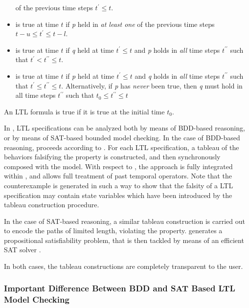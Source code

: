 \begin{itemize}
        of the previous time steps $t^\prime \leq t$.
  \item {} is true at time $t$ if
        \textit{p} held in \emph{at least one} of the previous time
        steps $t-u \leq t^\prime \leq t-l$.
  \item {} is true at time $t$ if \textit{q} held at time
        $t^\prime \leq t$ and \textit{p} holds in \emph{all} time steps $t^{\prime\prime}$ such
        that $t^\prime < t^{\prime\prime} \le t$.
  \item {} is true at time $t$ if \textit{p} held at time
        $t^\prime \leq t$ and \textit{q} holds in \emph{all} time steps $t^{\prime\prime}$ such
        that $t^\prime \le t^{\prime\prime} \le t$. Alternatively, if \textit{p} has \emph{never}
        been true, then \textit{q} must hold in all time steps $t^{\prime\prime}$ such
        that $t_0 \le t^{\prime\prime} \le t$
\end{itemize}
An LTL formula is true if it is true at the initial time $t_0$.

In \nusmv, LTL specifications can be analyzed both by means of
BDD-based reasoning, or by means of SAT-based bounded model
checking.
%
In the case of BDD-based reasoning, \nusmv proceeds according to
\cite{CGH97}.
%
For each LTL specification, a tableau of the behaviors falsifying the
property is constructed, and then synchronously composed with the
model.
%
With respect to \cite{CGH97}, the approach is fully integrated within
\nusmv, and allows full treatment of past temporal operators.
%
Note that the counterexample is generated in such a way to show that the falsity
of a LTL specification may contain state variables which have been
introduced by the tableau construction procedure.

In the case of SAT-based reasoning, a similar tableau construction is
carried out to encode the paths of limited length, violating the
property.
%
\nusmv generates a propositional satisfiability problem, that is then
tackled by means of an efficient SAT solver \cite{BCCZ99}.

In both cases, the tableau constructions are completely transparent to
the user.

\subsubsection{Important Difference Between BDD and SAT Based LTL Model Checking}
\label{Important Difference Between BDD and SAT Based LTL Model Checking}

